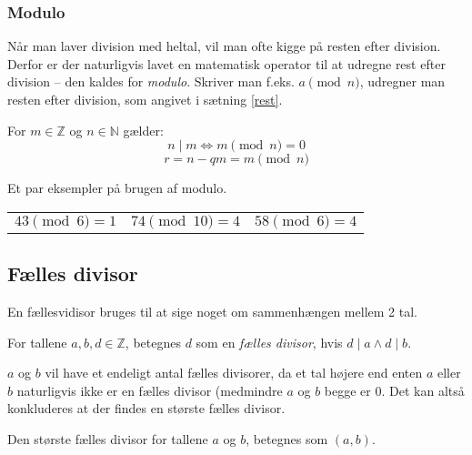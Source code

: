     \subsubsection{Modulo}
    Når man laver division med heltal, vil man ofte kigge på resten efter division.
    Derfor er der naturligvis lavet en matematisk operator til at udregne rest efter division -- den kaldes for \emph{modulo}.
    Skriver man f.eks. \(a \pmod{n}\), udregner man resten efter division, som angivet i sætning \ref{rest}.

    \begin{definition}
        For \(m \in \mathbb{Z}\) og \(n \in \mathbb{N}\) gælder:
        \[n \mid m \iff m \pmod{n} = 0\]
        \[r = n - q m = m \pmod{n}\]\cite[72]{krypto}
    \end{definition}

    \begin{eks}
        Et par eksempler på brugen af modulo.
        \begin{center}
            \setlength{\tabcolsep}{20pt} %
            \begin{tabular}{l c r}
                \(43 \pmod{6} = 1\) & \(74 \pmod{10} = 4\) & \(58 \pmod{6} = 4\)
            \end{tabular}
        \end{center}
    \end{eks}




    \subsection{Fælles divisor}
    En fællesvidisor bruges til at sige noget om sammenhængen mellem 2 tal.

    \begin{definition}
        For tallene \(a, b, d \in \mathbb{Z}\), betegnes \(d\) som en \emph{fælles divisor}, hvis \(d \mid a \land d \mid b\).
    \end{definition}

    \(a\) og \(b\) vil have et endeligt antal fælles divisorer, da et tal højere end enten \(a\) eller \(b\) naturligvis ikke er en fælles divisor (medmindre \(a\) og \(b\) begge er \(0\).
    Det kan altså konkluderes at der findes en største fælles divisor.

    \begin{definition}
        Den største fælles divisor for tallene \(a\) og \(b\), betegnes som \((a, b)\).
    \end{definition}

